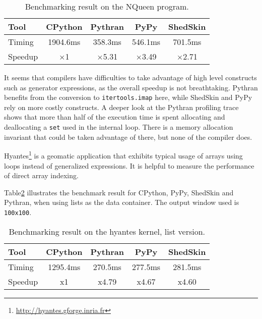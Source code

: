 \documentclass[10pt, onecolumn, preprint]{sigplanconf}
\begin{document}
\begin{table}
    \centering

    \begin{tabular}{|l|c|c|c|c|}
        \hline
     Tool    &  CPython    &   Pythran     &     PyPy   &  ShedSkin \\
    \hline
     Timing  &  1904.6ms   &   358.3ms     &    546.1ms &  701.5ms  \\
    \hline
     Speedup &  $\times$1         &    $\times$5.31      &    $\times$3.49   &  $\times$2.71    \\
    \hline
\end{tabular}
\caption{Benchmarking result on the NQueen program.}
\label{tbl:nqueen}

\end{table}

It seems that compilers have difficulties to take advantage of high level
constructs such as generator expressions, as the overall speedup is not
breathtaking. Pythran benefits from the conversion to \texttt{itertools.imap} here,
while ShedSkin and PyPy rely on more costly constructs. A deeper look at the
Pythran profiling trace shows that more than half of the execution time is
spent allocating and deallocating a \texttt{set} used in the internal loop. There is a
memory allocation invariant that could be taken advantage of there, but none of
the compiler does.

Hyantes\footnote{\url{http://hyantes.gforge.inria.fr}} is a geomatic application that exhibits typical usage of arrays
using loops instead of generalized expressions. It is helpful to measure the
performance of direct array indexing.

Table\ref{tbl:hyantes} illustrates the benchmark result for CPython, PyPy,
ShedSkin and Pythran, when using lists as the data container. The output window
used is \texttt{100x100}.

\begin{table}
    \centering

    \begin{tabular}{|l|c|c|c|c|}

        \hline
     Tool    &  CPython    &   Pythran     &     PyPy   &  ShedSkin  \\
    \hline
     Timing  &  1295.4ms   &   270.5ms     &    277.5ms &  281.5ms   \\
    \hline
     Speedup &  x1         &    x4.79      &    x4.67   &  x4.60     \\
    \hline
\end{tabular}
\caption{Benchmarking result on the hyantes kernel, list version.}
\label{tbl:hyantes}

\end{table}
\end{document}
